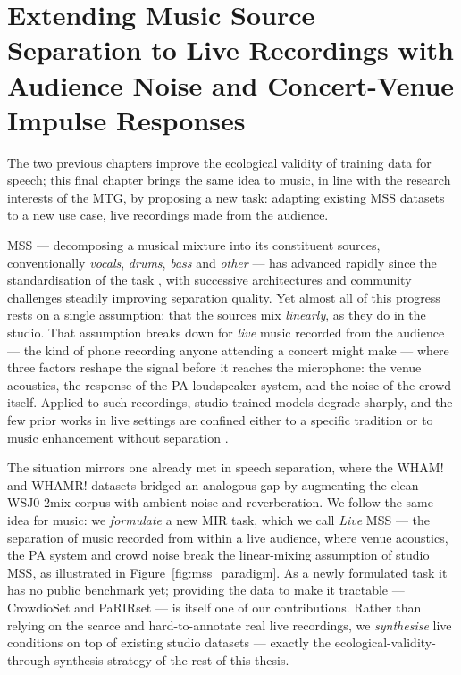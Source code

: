 
\chapter{Extending Music Source Separation to Live Recordings with Audience Noise and Concert-Venue Impulse Responses}
\label{ch05_mss}

The two previous chapters improve the ecological validity of training data for
speech; this final chapter brings the same idea to music, in line with the
research interests of the \acrfull{MTG}, by proposing a new task: adapting
existing \acrfull{MSS} datasets to a new use case, live recordings made from the
audience.

\acrshort{MSS} --- decomposing a musical mixture into its constituent sources,
conventionally \emph{vocals}, \emph{drums}, \emph{bass} and \emph{other} --- has
advanced rapidly since the standardisation of the task
\citep{rafii2019musdbhq, stoter2019openunmix}, with successive architectures
\citep{rouard2023htdemucs, luo2023bsrnn, tong2024scnet} and community
challenges \citep{fabbro2024sdx23, mitsufuji2022music} steadily improving
separation quality. Yet almost all of this progress rests on a single
assumption: that the sources mix \emph{linearly}, as they do in the studio. That
assumption breaks down for \emph{live} music recorded from the audience --- the
kind of phone recording anyone attending a concert might make --- where three
factors reshape the signal before it reaches the microphone: the venue
acoustics, the response of the \acrfull{PA} loudspeaker system, and the noise of
the crowd itself. Applied to such recordings, studio-trained models degrade
sharply, and the few prior works in live settings are confined either to a
specific tradition \citep{plaja-carnatic_separation} or to music enhancement without
separation \citep{kandpal2022musicenhancement}.

The situation mirrors one already met in speech separation, where the WHAM!
\citep{wichern2019wham} and WHAMR! \citep{maciejewski2020whamr} datasets bridged
an analogous gap by augmenting the clean WSJ0-2mix corpus with ambient noise and
reverberation. We follow the same idea for music: we \emph{formulate} a new \acrfull{MIR}
task, which we call \emph{Live} \acrshort{MSS} --- the separation of music recorded from within a
live audience, where venue acoustics, the \acrshort{PA} system and crowd noise
break the linear-mixing assumption of studio \acrshort{MSS}, as illustrated in
Figure~\ref{fig:mss_paradigm}. As a newly formulated task it has no
public benchmark yet; providing the data to make it tractable --- CrowdioSet and
PaRIRset --- is itself one of our contributions. Rather than relying on the scarce and
hard-to-annotate real live recordings, we \emph{synthesise} live conditions on
top of existing studio datasets --- exactly the ecological-validity-through-synthesis
strategy of the rest of this thesis.

